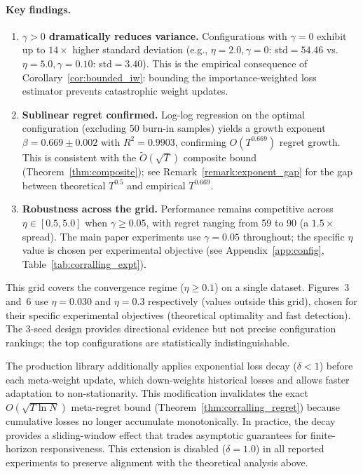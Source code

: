 \paragraph{Key findings.}
\begin{enumerate}[nosep]
    \item \textbf{$\gamma > 0$ dramatically reduces variance.}  Configurations
    with $\gamma = 0$ exhibit up to $14\times$ higher standard deviation
    (e.g., $\eta{=}2.0, \gamma{=}0$: std$=54.46$ vs.\
    $\eta{=}5.0, \gamma{=}0.10$: std$=3.40$).  This is the empirical
    consequence of Corollary~\ref{cor:bounded_iw}: bounding the
    importance-weighted loss estimator prevents catastrophic weight updates.

    \item \textbf{Sublinear regret confirmed.}  Log-log regression on the
    optimal configuration (excluding 50 burn-in samples) yields a growth
    exponent $\beta = 0.669 \pm 0.002$ with $R^2 = 0.9903$, confirming
    $O(T^{0.669})$ regret growth.  This is consistent with the
    $\tilde{O}(\sqrt{T})$ composite bound (Theorem~\ref{thm:composite});
    see Remark~\ref{remark:exponent_gap} for the gap between theoretical
    $T^{0.5}$ and empirical $T^{0.669}$.

    \item \textbf{Robustness across the grid.}  Performance remains competitive
    across $\eta \in [0.5, 5.0]$ when $\gamma \geq 0.05$, with regret
    ranging from 59 to 90 (a $1.5\times$ spread).  The main paper experiments
    use $\gamma = 0.05$ throughout; the specific $\eta$ value is chosen per
    experimental objective (see Appendix~\ref{app:config},
    Table~\ref{tab:corralling_expt}).
\end{enumerate}

\begin{remark}
\label{remark:ablation_scope}
This grid covers the convergence regime ($\eta \geq 0.1$) on a single dataset.
Figures~3 and~6 use $\eta = 0.030$ and $\eta = 0.3$ respectively (values
outside this grid), chosen for their specific experimental objectives
(theoretical optimality and fast detection).  The 3-seed design provides
directional evidence but not precise configuration rankings; the top
configurations are statistically indistinguishable.
\end{remark}

\begin{remark}
\label{remark:loss_decay}
The production library additionally applies exponential loss decay
($\delta < 1$) before each meta-weight update, which down-weights historical
losses and allows faster adaptation to non-stationarity.  This modification
invalidates the exact $O(\sqrt{T \ln N})$ meta-regret bound
(Theorem~\ref{thm:corralling_regret}) because cumulative losses no longer
accumulate monotonically.  In practice, the decay provides a sliding-window
effect that trades asymptotic guarantees for finite-horizon responsiveness.
This extension is disabled ($\delta = 1.0$) in all reported experiments to
preserve alignment with the theoretical analysis above.
\end{remark}
